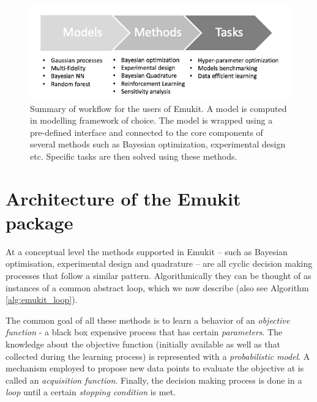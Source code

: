 \begin{figure}[h]
    \centering
    \includegraphics[scale=0.4]{workflow.png}  
    \caption{Summary of workflow for the users of Emukit. A model is computed in modelling framework of choice. The model is wrapped using a pre-defined interface and connected to the core components of several methods such as Bayesian optimization, experimental design etc. Specific tasks are then solved using these methods.}
    \label{figure:workflow}
\end{figure}

\section{Architecture of the Emukit package}

At a conceptual level the methods supported in Emukit -- such as Bayesian optimisation, experimental design and quadrature -- are all cyclic decision making processes that follow a similar pattern. Algorithmically they can be thought of as instances of a common abstract loop, which we now describe (also see Algorithm \ref{alg:emukit_loop}).

The common goal of all these methods is to learn a behavior of an \textit{objective function} - a black box expensive process that has certain \textit{parameters}. The knowledge about the objective function (initially available as well as that collected during the learning process) is represented with a \textit{probabilistic model}. A mechanism employed to propose new data points to evaluate the objective at is called an \textit{acquisition function}. Finally, the decision making process is done in a \textit{loop} until a certain \textit{stopping condition} is met. 


